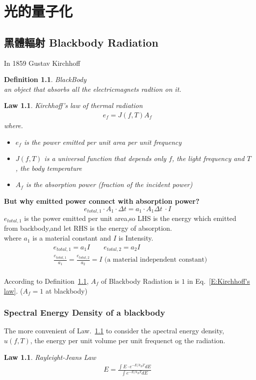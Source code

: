 \documentclass[12pt,a4paper]{book}
\newtheorem{defn}[thm]{Definition}
\newtheorem{laws}[thm]{Law}
\begin{document}
	\chapter{光的量子化}
	\section{黑體輻射 Blackbody Radiation}
	In 1859 Gustav Kirchhoff 
	\begin{defn}\label{D:BlackBody}
		BlackBody\\
		 an object that absorbs all the electricmagnets radtion on it.
	\end{defn}
	\begin{laws}\label{L:Kirchhoff's law of thermal radiation}
		Kirchhoff's law of thermal radiation\\
		\begin{align}e_f=J(f,T)A_f\label{E:Kirchhoff's law}\end{align}
	where.
	\begin{itemize}
		\item $e_f$ is the power emitted per unit area per unit frequency
		\item $J(f,T)$ is a universal function that depends only $f$, the light frequency and $T$, the body temperature
		\item $A_f$ is the absorption power (fraction of the incident power)\\
	\end{itemize}
	\end{laws}
	
	\textbf{But why emitted power connect with absorption power?}
	\[e_{total,1} \cdot A_1 \cdot \Delta t = a_1 \cdot A_1 \Delta t\ \cdot I\]
	$e_{total,1}$ is the power emitted per unit area,so LHS is the energy which emitted from backbody,and let RHS is the energy of absorption.\\
	where $a_1$ is a material constant and $I$ is Intensity.
	\begin{align*}
		&e_{total,1} = a_1I\qquad e_{total,2} = a_2I\\
		&\frac{e_{total,1}}{a_1}=\frac{e_{total,2}}{a_2}=I\mbox{ (a material independent constant)}
	\end{align*}
	\\
	According to Definition~\ref{D:BlackBody}, $A_f$ of Blackbody Radiation is $1$ in Eq.~\ref{E:Kirchhoff's law}. ($A_f=1$ at blackbody)
	
		\subsection{Spectral Energy Density of a blackbody}
		The more convenient of Law.~\ref{L:Kirchhoff's law of thermal radiation} to consider
		the apectral energy density, $u(f,T)$, the energy per unit volume per unit frequenct og the radiation.
		\begin{laws}\label{L:Rayleight-Jeans Law}
			Rayleight-Jeans Law\\
			\begin{align}
			E=\frac{\int E \cdot e^{-E/k_BT}dE}{\int e^{-E/k_BT}dE}
			\end{align}
		\end{laws}
\end{document}
